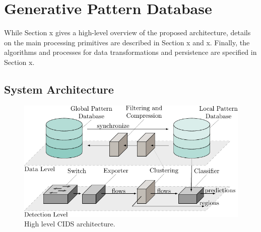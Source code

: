 \chapter{Generative Pattern Database}
While Section x gives a high-level overview of the proposed architecture, details on the main processing primitives are described in Section x and x. Finally, the algorithms and processes for data transformations and persistence are specified in Section x.

\section{System Architecture}



\begin{figure}[t]
    \centering
    \includegraphics[width=1\linewidth]{tikz/high_level_architecture.pdf}
    \caption{High level CIDS architecture.}
    \label{fig:high_level_architecture}
    \end{figure}

